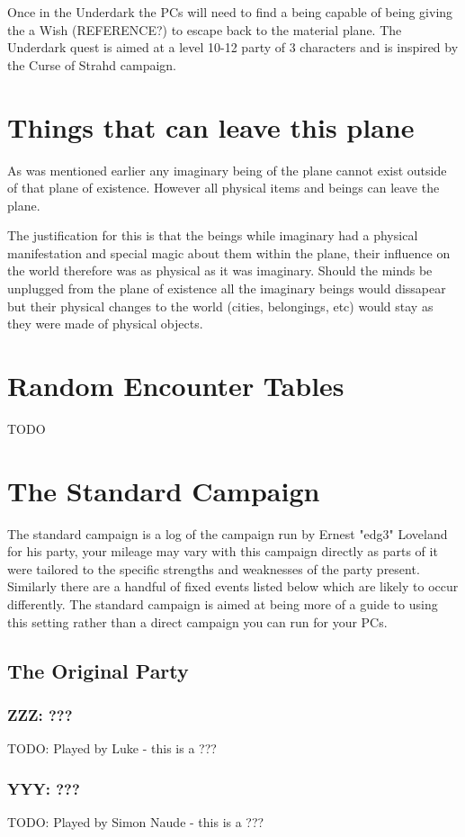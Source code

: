 \documentclass[10pt,twoside,twocolumn]{article}
\begin{document}
Once in the Underdark the PCs will need to find a being capable of being giving the a Wish (REFERENCE?) to escape back to the material plane. The Underdark quest is aimed at a level 10-12 party of 3 characters and is inspired by the Curse of Strahd campaign.

\section{Things that can leave this plane}
As was mentioned earlier any imaginary being of the plane cannot exist outside of that plane of existence. However all physical items and beings can leave the plane.

The justification for this is that the beings while imaginary had a physical manifestation and special magic about them within the plane, their influence on the world therefore was as physical as it was imaginary. Should the minds be unplugged from the plane of existence all the imaginary beings would dissapear but their physical changes to the world (cities, belongings, etc) would stay as they were made of physical objects.

\section{Random Encounter Tables}

TODO

\section{The Standard Campaign}
The standard campaign is a log of the campaign run by Ernest "edg3" Loveland for his party, your mileage may vary with this campaign directly as parts of it were tailored to the specific strengths and weaknesses of the party present. Similarly there are a handful of fixed events listed below which are likely to occur differently. The standard campaign is aimed at being more of a guide to using this setting rather than a direct campaign you can run for your PCs.

\subsection{The Original Party}
\subsubsection{ZZZ: ???}
TODO: Played by Luke - this is a ???
\subsubsection{YYY: ???}
TODO: Played by Simon Naude - this is a  ???
\end{document}
